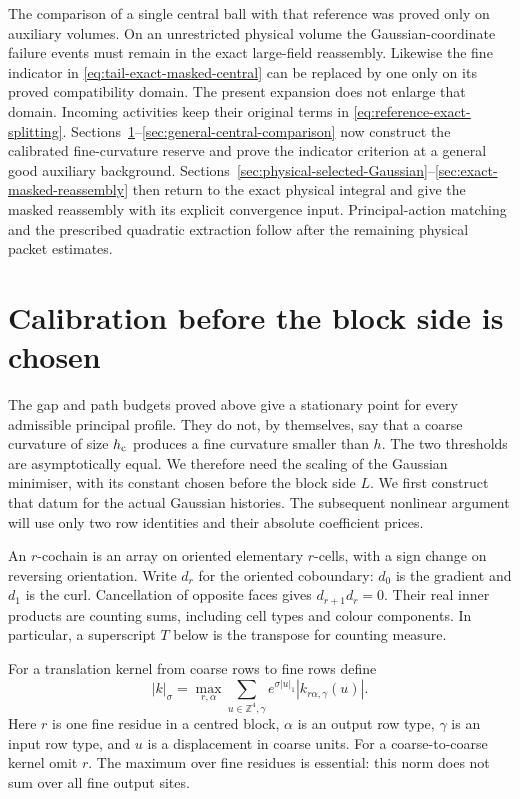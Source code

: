 \documentclass[11pt,reqno]{amsart}
\numberwithin{equation}{section}
\theoremstyle{definition}
\theoremstyle{remark}
\newcommand{\Z}{\mathbb Z}
\begin{document}
The comparison of a single central
ball with that reference was proved
only on auxiliary volumes.
On an unrestricted physical volume
the Gaussian-coordinate failure
events must remain in the exact
large-field reassembly.
Likewise the fine indicator in
\eqref{eq:tail-exact-masked-central}
can be replaced by one only on its
proved compatibility domain.
The present expansion does not
enlarge that domain.
Incoming activities keep their
original terms in
\eqref{eq:reference-exact-splitting}.
Sections~\ref{sec:calibrated-rows}--\ref{sec:general-central-comparison}
now construct the calibrated fine-curvature reserve and prove
the indicator criterion at a general good auxiliary background.
Sections~\ref{sec:physical-selected-Gaussian}--\ref{sec:exact-masked-reassembly}
then return to the exact physical integral and give the masked
reassembly with its explicit convergence input. Principal-action
matching and the prescribed quadratic extraction follow after
the remaining physical packet estimates.


\section{Calibration before the block side is chosen}
\label{sec:calibrated-rows}

The gap and path budgets proved above give a stationary point for
every admissible principal profile. They do not, by themselves,
say that a coarse curvature of size \(h_{\rm c}\) produces a fine
curvature smaller than \(h\). The two thresholds are asymptotically
equal. We therefore need the scaling of the Gaussian minimiser,
with its constant chosen before the block side \(L\). We first
construct that datum for the actual Gaussian histories. The
subsequent nonlinear argument will use only two row identities
and their absolute coefficient prices.

An \(r\)-cochain is an array on oriented elementary \(r\)-cells,
with a sign change on reversing orientation. Write \(d_r\) for
the oriented coboundary: \(d_0\) is the gradient and \(d_1\) is
the curl. Cancellation of opposite faces gives
\(d_{r+1}d_r=0\). Their real inner products are counting sums,
including cell types and colour components.
In particular, a superscript \(T\) below is the transpose for
counting measure.

For a translation kernel from coarse rows to fine rows define
\[
 |k|_\sigma=\max_{r,\alpha}
       \sum_{u\in\Z^4,\gamma}e^{\sigma|u|_1}
                             |k_{r\alpha,\gamma}(u)|.
\]
Here \(r\) is one fine residue in a centred block, \(\alpha\)
is an output row type, \(\gamma\) is an input row type, and
\(u\) is a displacement in coarse units. For a coarse-to-coarse
kernel omit \(r\). The maximum over fine residues is essential:
this norm does not sum over all fine output sites.
\end{document}
